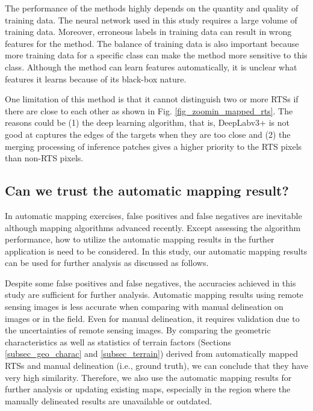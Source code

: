 \documentclass[preprint,12pt,authoryear]{elsarticle}
\begin{document}
The performance of the methods highly depends on the quantity and quality of training data. The neural network used in this study requires a large volume of training data. Moreover, erroneous labels in training data can result in wrong features for the method. The balance of training data is also important because more training data for a specific class can make the method more sensitive to this class. Although the method can learn features automatically, it is unclear what features it learns because of its black-box nature. 

One limitation of this method is that it cannot distinguish two or more RTSs if there are close to each other as shown in Fig. \ref{fig_zoomin_mapped_rts}.%
The reasons could be (1) the deep learning algorithm, that is, DeepLabv3+ is not good at captures the edges of the targets when they are too close and (2) the merging processing of inference patches gives a higher priority to the RTS pixels than non-RTS pixels.

\subsection{Can we trust the automatic mapping result?}
\label{subsec_potential_largeArea}


In automatic mapping exercises, false positives and false negatives are inevitable although mapping algorithms advanced recently.
Except assessing the algorithm performance, how to utilize the automatic mapping results in the further application is need to be considered. In this study, our automatic mapping results can be used for further analysis as discussed as follows.

Despite some false positives and false negatives, the accuracies achieved in this study are sufficient for further analysis. Automatic mapping results using remote sensing images is less accurate when comparing with manual delineation on images or in the field. Even for manual delineation, it requires validation due to the uncertainties of remote sensing images. By comparing the geometric characteristics as well as statistics of terrain factors (Sections \ref{subsec_geo_charac} and \ref{subsec_terrain}) derived from automatically mapped RTSs and manual delineation (i.e., ground truth), we can conclude that they have very high similarity. Therefore, we also use the automatic mapping results for further analysis or updating existing maps, especially in the region where the manually delineated results are unavailable or outdated. 
\end{document}
